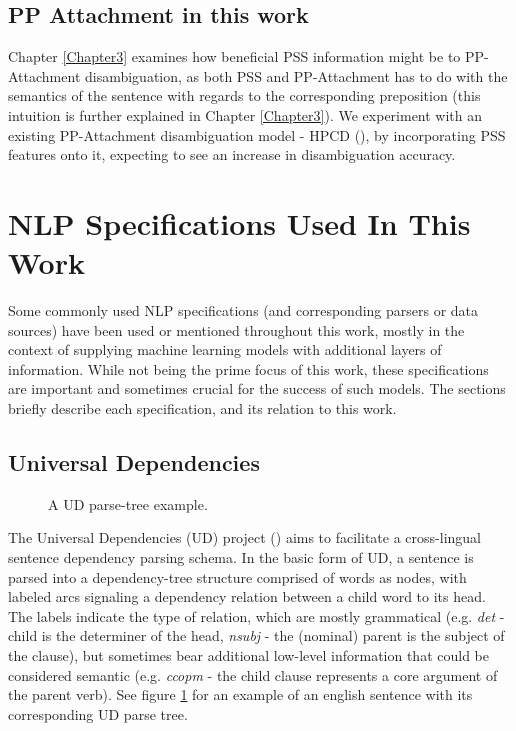 \subsection{PP Attachment in this work} \label{sec:ppatt_thiswork}

Chapter \ref{Chapter3} examines how beneficial PSS information might be to PP-Attachment disambiguation, as both PSS and PP-Attachment has to do with the semantics of the sentence with regards to the corresponding preposition (this intuition is further explained in Chapter \ref{Chapter3}). We experiment with an existing PP-Attachment disambiguation model - HPCD (\cite{hpcd}), by incorporating PSS features onto it, expecting to see an increase in disambiguation accuracy.

\pagebreak

\section{NLP Specifications Used In This Work}

Some commonly used NLP specifications (and corresponding parsers or data sources) have been used or mentioned throughout this work, mostly in the context of supplying machine learning models with additional layers of information. While not being the prime focus of this work, these specifications are important and sometimes crucial for the success of such models. The sections briefly describe each specification, and its relation to this work. 

\subsection{Universal Dependencies}\label{sec:ud}

\begin{figure}
    \centering
    
    \caption{A UD parse-tree example.}
    \label{fig:udparsetree}
\end{figure}

The Universal Dependencies (UD) project (\cite{nivre-16}) aims to facilitate a cross-lingual sentence dependency parsing schema. In the basic form of UD, a sentence is parsed into a dependency-tree structure comprised of words as nodes, with labeled arcs signaling a dependency relation between a child word to its head. The labels indicate the type of relation, which are mostly grammatical (e.g. \emph{det} - child is the determiner of the head, \emph{nsubj} - the (nominal) parent is the subject of the clause), but sometimes bear additional low-level information that could be considered semantic (e.g. \emph{ccopm} - the child clause represents a core argument of the parent verb). See figure \ref{fig:udparsetree} for an example of an english sentence with its corresponding UD parse tree.

